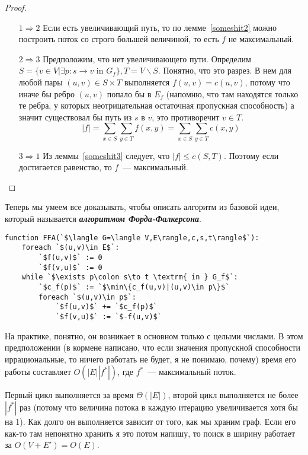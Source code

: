 \begin{proof}$ $\newline %
	\begin{itemize}
		\item[$\mathrm{1}\Rightarrow\mathrm{2}$] Если есть увеличивающий путь, то по лемме~\ref{someshit2} можно построить поток со строго большей величиной, то есть $f$ не максимальный.
		\item[$\mathrm{2}\Rightarrow\mathrm{3}$] Предположим, что нет увеличивающего пути. Определим $S=\{v\in V|\exists p\colon s\to v\textrm{ in }G_f\}, T=V\smallsetminus S$. Понятно, что это разрез. В нем для любой пары $(u,v)\in S\times T$ выполняется $f(u,v)=c(u,v)$, потому что иначе бы ребро $(u,v)$ попало бы в $E_f$ (напомню, что там находятся только те ребра, у которых неотрицательная остаточная пропускная способность) а значит существовал бы путь из $s$ в $v$, это противоречит $v\in T$. $$|f|=\sum_{x\in S}\sum_{y\in T}f(x,y)=\sum_{x\in S}\sum_{y\in T}c(x,y)$$
		\item[$\mathrm{3}\Rightarrow\mathrm{1}$] Из леммы~\ref{someshit3} следует, что $|f|\le c(S,T)$. Поэтому если достигается равенство, то $f$~--- максимальный.
	\end{itemize}
\end{proof}

Теперь мы умеем все доказывать, чтобы описать алгоритм из базовой идеи, который называется {\bf\it алгоритмом Форда-Фалкерсона}.
\begin{lstlisting}[escapeinside=``]
function FFA(`$\langle G=\langle V,E\rangle,c,s,t\rangle$`):
	foreach `$(u,v)\in E$`:
		`$f(u,v)$` := 0
		`$f(v,u)$` := 0
	while `$\exists p\colon s\to t \textrm{ in } G_f$`:
		`$c_f(p)$` := `$\min\{c_f(u,v)|(u,v)\in p\}$`
		foreach `$(u,v)\in p$`:
			`$f(u,v)$` += `$c_f(p)$`
			`$f(v,u)$` := `$-f(u,v)$`
\end{lstlisting}

На практике, понятно, он возникает в основном только с целыми числами. В этом предположении (в кормене написано, что если значения пропускной способности иррациональные, то ничего работать не будет, я не понимаю, почему) время его работы составляет $O(|E||f^*|)$, где $f^*$~--- максимальный поток.

Первый цикл выполняется за время $\Theta(|E|)$, второй цикл выполняется не более $|f^*|$ раз (потому что величина потока в каждую итерацию увеличивается хотя бы на 1). Как долго он выполняется зависит от того, как мы храним граф. Если его как-то там непонятно хранить я это потом напишу, то поиск в ширину работает за $O(V+E')=O(E)$.